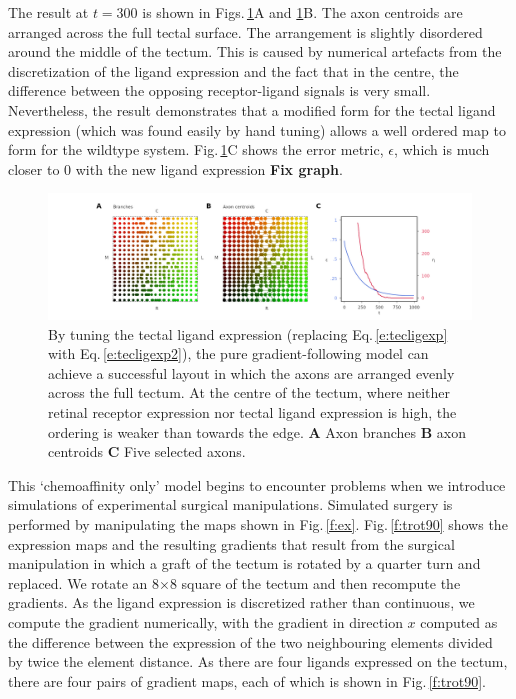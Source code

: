 \documentclass[11pt, a4paper]{article}
\begin{document}
The result at $t=300$ is shown in Figs.\,\ref{f:chalt}A
and \ref{f:chalt}B. The axon centroids are arranged across the full tectal
surface.  The arrangement is slightly disordered around the middle of the
tectum. This is caused by numerical artefacts from the discretization of the
ligand expression and the fact that in the centre, the difference between the
opposing receptor-ligand signals is very small. Nevertheless, the result
demonstrates that a modified form for the tectal ligand expression (which was
found easily by hand tuning) allows a well ordered map to form for the
wildtype system. Fig.\,\ref{f:chalt}C shows the error metric, $\epsilon$,
which is much closer to 0 with the new ligand expression \textbf{Fix graph}.

\begin{figure}
\includegraphics[width=\linewidth]{./images/j4_eE_G_wt_fig3.png}
\caption{By tuning the tectal ligand expression (replacing Eq.\,\ref{e:tecligexp} with
 Eq.\,\ref{e:tecligexp2}), the pure gradient-following model can achieve a
 successful layout in which the axons are arranged evenly across the full
 tectum. At the centre of the tectum, where neither retinal receptor
 expression nor tectal ligand expression is high, the ordering is weaker than
 towards the edge. \textbf{A} Axon branches \textbf{B} axon
 centroids \textbf{C} Five selected axons.}
\label{f:chalt}
\end{figure}

This `chemoaffinity only' model begins to encounter problems when we introduce
simulations of experimental surgical manipulations. Simulated surgery is
performed by manipulating the maps shown in
Fig.\,\ref{f:ex}. Fig.\,\ref{f:trot90} shows the expression maps and the
resulting gradients that result from the surgical manipulation in which a
graft of the tectum is rotated by a quarter turn and replaced. We rotate an
8$\times$8 square of the tectum and then recompute the gradients. As the ligand
expression is discretized rather than continuous, we compute the gradient
numerically, with the gradient in direction $x$ computed as the difference
between the expression of the two neighbouring elements divided by twice the
element distance. As there are four ligands expressed on the tectum, there are
four pairs of gradient maps, each of which is shown in Fig.\,\ref{f:trot90}.
\end{document}
